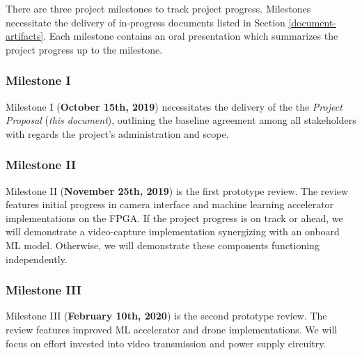 There are three project milestones to track project progress.
Milestones necessitate the delivery of in-progress documents listed
in Section \ref{document-artifacts}. Each milestone contains an oral
presentation which summarizes the project progress up to the milestone.

\subsubsection{Milestone I}
Milestone I (\textbf{October 15th, 2019}) necessitates the delivery of the
the \textit{Project Proposal} (\textit{this document}), outlining
the baseline agreement among all stakeholders with 
regards the project's administration and scope.

\subsubsection{Milestone II}
Milestone II (\textbf{November 25th, 2019}) is the first prototype review. 
The review features initial progress in camera interface
and machine learning accelerator implementations on the FPGA.
If the project progress is on track or ahead, we will demonstrate a video-capture implementation synergizing with an onboard ML model. Otherwise, we will
demonstrate these components functioning independently.

\subsubsection{Milestone III}
Milestone III (\textbf{February 10th, 2020}) is the second prototype review.
The review features improved ML accelerator and drone implementations. We will
focus on effort invested into video transmission and power supply circuitry.

